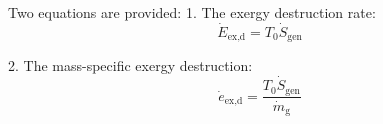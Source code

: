 Two equations are provided:  
1. The exergy destruction rate:  
\[
\dot{E}_{\text{ex,d}} = T_0 \dot{S}_{\text{gen}}
\]

2. The mass-specific exergy destruction:  
\[
\dot{e}_{\text{ex,d}} = \frac{T_0 \dot{S}_{\text{gen}}}{\dot{m}_{\text{g}}}
\]